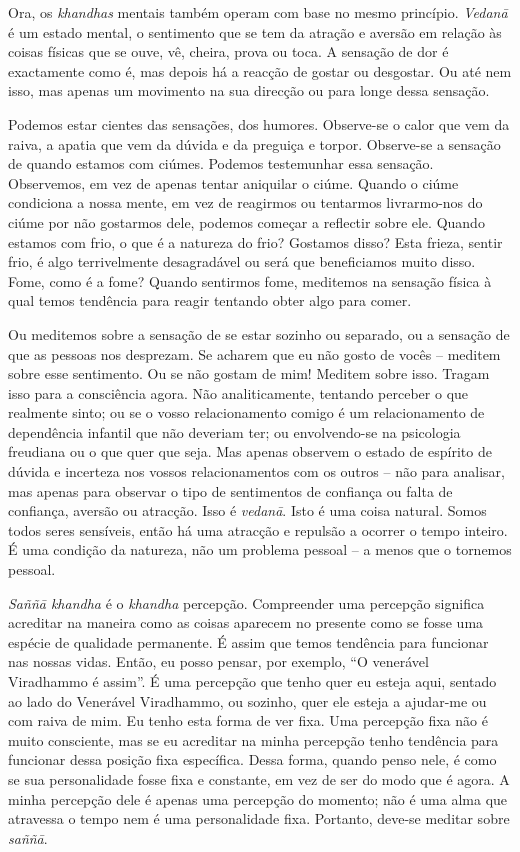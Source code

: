 Ora, os \emph{khandhas} mentais também operam com base no mesmo princípio.
\emph{Vedanā} é um estado mental, o sentimento que se tem da atração e aversão
em relação às coisas físicas que se ouve, vê, cheira, prova ou toca. A sensação
de dor é exactamente como é, mas depois há a reacção de gostar ou desgostar. Ou
até nem isso, mas apenas um movimento na sua direcção ou para longe dessa
sensação.

Podemos estar cientes das sensações, dos humores. Observe-se o calor que vem da
raiva, a apatia que vem da dúvida e da preguiça e torpor. Observe-se a
sensação de quando estamos com ciúmes. Podemos testemunhar essa sensação.
Observemos, em vez de apenas tentar aniquilar o ciúme. Quando o ciúme condiciona
a nossa mente, em vez de reagirmos ou tentarmos livrarmo-nos do ciúme por não
gostarmos dele, podemos começar a reflectir sobre ele. Quando estamos com frio,
o que é a natureza do frio? Gostamos disso? Esta frieza, sentir frio, é algo
terrivelmente desagradável ou será que beneficiamos muito disso. Fome, como é a
fome? Quando sentirmos fome, meditemos na sensação física à qual temos tendência
para reagir tentando obter algo para comer.

Ou meditemos sobre a sensação de se estar sozinho ou separado, ou a sensação de
que as pessoas nos desprezam. Se acharem que eu não gosto de vocês -- meditem
sobre esse sentimento. Ou se não gostam de mim! Meditem sobre isso. Tragam isso
para a consciência agora. Não analiticamente, tentando perceber o que realmente
sinto; ou se o vosso relacionamento comigo é um relacionamento de dependência
infantil que não deveriam ter; ou envolvendo-se na psicologia freudiana ou o que
quer que seja. Mas apenas observem o estado de espírito de dúvida e incerteza
nos vossos relacionamentos com os outros -- não para analisar, mas
apenas para observar o tipo de sentimentos de confiança ou falta de confiança,
aversão ou atracção. Isso é \emph{vedanā}. Isto é uma coisa natural. Somos todos
seres sensíveis, então há uma atracção e repulsão a ocorrer o tempo inteiro. É
uma condição da natureza, não um problema pessoal -- a menos que o tornemos
pessoal.

\emph{Saññā khandha} é o \emph{khandha} percepção. Compreender uma percepção
significa acreditar na maneira como as coisas aparecem no presente como se fosse
uma espécie de qualidade permanente. É assim que temos tendência para funcionar
nas nossas vidas. Então, eu posso pensar, por exemplo, ``O venerável Viradhammo
é assim''. É uma percepção que tenho quer eu esteja aqui, sentado ao lado do
Venerável Viradhammo, ou sozinho, quer ele esteja a ajudar-me ou com raiva de
mim. Eu tenho esta forma de ver fixa. Uma percepção fixa não é muito consciente,
mas se eu acreditar na minha percepção tenho tendência para funcionar dessa
posição fixa específica. %
Dessa forma, quando penso nele, é como se sua
personalidade fosse fixa e constante, em vez de ser do modo que é agora. A minha
percepção dele é apenas uma percepção do momento; não é uma alma que atravessa o
tempo nem é uma personalidade fixa. Portanto, deve-se meditar sobre
\emph{saññā}.

